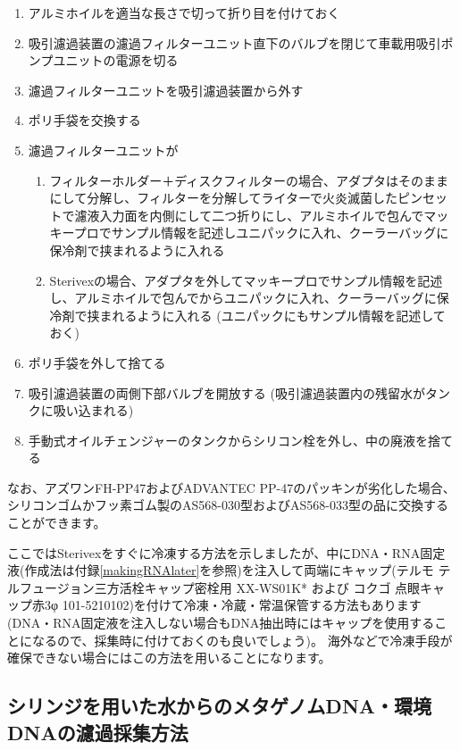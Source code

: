 \documentclass[titlepage,10pt,a4paper]{jsbook}
\begin{document}
\begin{enumerate}
\item アルミホイルを適当な長さで切って折り目を付けておく
\item 吸引濾過装置の濾過フィルターユニット直下のバルブを閉じて車載用吸引ポンプユニットの電源を切る
\item 濾過フィルターユニットを吸引濾過装置から外す
\item ポリ手袋を交換する
\item 濾過フィルターユニットが
\begin{enumerate}
\item フィルターホルダー＋ディスクフィルターの場合、アダプタはそのままにして分解し、フィルターを分解してライターで火炎滅菌したピンセットで濾液入力面を内側にして二つ折りにし、アルミホイルで包んでマッキープロでサンプル情報を記述しユニパックに入れ、クーラーバッグに保冷剤で挟まれるように入れる
\item Sterivexの場合、アダプタを外してマッキープロでサンプル情報を記述し、アルミホイルで包んでからユニパックに入れ、クーラーバッグに保冷剤で挟まれるように入れる (ユニパックにもサンプル情報を記述しておく)
\end{enumerate}
\item ポリ手袋を外して捨てる
\item 吸引濾過装置の両側下部バルブを開放する (吸引濾過装置内の残留水がタンクに吸い込まれる)
\item 手動式オイルチェンジャーのタンクからシリコン栓を外し、中の廃液を捨てる
\end{enumerate}

なお、アズワンFH-PP47およびADVANTEC PP-47のパッキンが劣化した場合、シリコンゴムかフッ素ゴム製のAS568-030型およびAS568-033型の品に交換することができます。

ここではSterivexをすぐに冷凍する方法を示しましたが、中にDNA・RNA固定液(作成法は付録\ref{makingRNAlater}を参照)を注入して両端にキャップ(テルモ テルフュージョン三方活栓キャップ密栓用 XX-WS01K* および コクゴ 点眼キャップ赤3φ 101-5210102)を付けて冷凍・冷蔵・常温保管する方法もあります(DNA・RNA固定液を注入しない場合もDNA抽出時にはキャップを使用することになるので、採集時に付けておくのも良いでしょう)。
海外などで冷凍手段が確保できない場合にはこの方法を用いることになります。

\subsection{シリンジを用いた水からのメタゲノムDNA・環境DNAの濾過採集方法}
\end{document}
